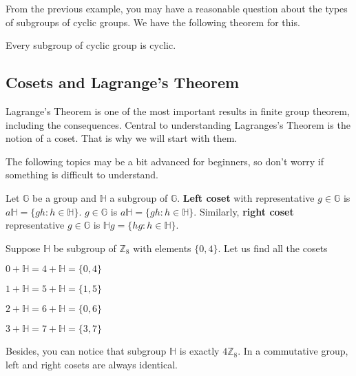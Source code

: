 \documentclass[../lecture-notes-148x210.tex]{subfiles}
\begin{document}
From the previous example, you may have a reasonable question about the types of subgroups 
of cyclic groups. We have the following theorem for this.

\begin{theorem}
    Every subgroup of cyclic group is cyclic.
\end{theorem}

\subsection{Cosets and Lagrange's Theorem}
 
Lagrange's Theorem \cite[section 6]{Judson_2012} is one of the most important results in finite group theorem, including 
the consequences. Central to understanding Lagranges's Theorem is the notion of a
coset. That is why we will start with them.

The following topics may be a bit advanced for beginners, so don't worry if something 
is difficult to understand.

\begin{definition}
    Let $\mathbb{G}$ be a group and $\mathbb{H}$ a subgroup of $\mathbb{G}$. \textbf{Left coset} 
    with representative $g \in \mathbb{G}$ is $a \mathbb{H} = \{gh : h \in \mathbb{H}\}$.
    $g \in \mathbb{G}$ is $a \mathbb{H} = \{gh : h \in \mathbb{H}\}$. Similarly, 
    \textbf{right coset} representative $g \in \mathbb{G}$ is $\mathbb{H}g = \{hg : h \in \mathbb{H}\}$.
\end{definition}

\begin{example}
    Suppose $\mathbb{H}$ be subgroup of $\mathbb{Z}_{8}$ with elements $\{0, 4\}$. 
    Let us find all the cosets
    \begin{center} %
        \vspace{-8mm}
        \item $0 + \mathbb{H} = 4 + \mathbb{H} = \{0, 4\}$
        \item $1 + \mathbb{H} = 5 + \mathbb{H} = \{1, 5\}$
        \item $2 + \mathbb{H} = 6 + \mathbb{H} = \{0, 6\}$
        \item $3 + \mathbb{H} = 7 + \mathbb{H} = \{3, 7\}$
    \end{center}
\end{example}

Besides, you can notice that subgroup $\mathbb{H}$ is exactly $4\mathbb{Z}_{8}$. In a commutative group, left and 
right cosets are always identical.
\end{document}
